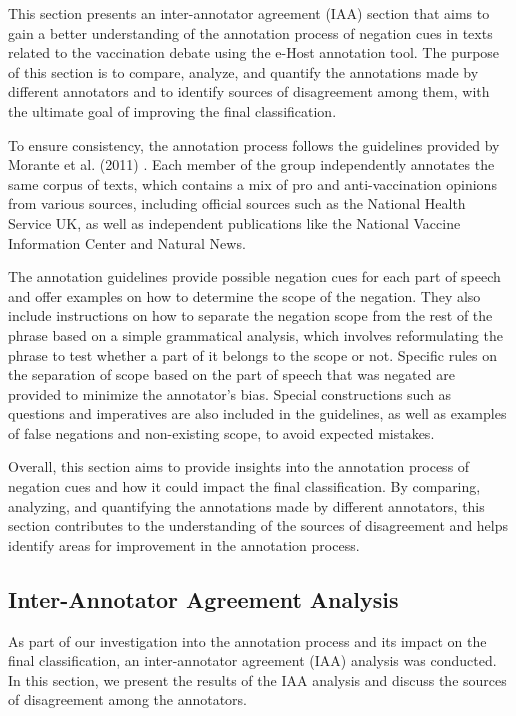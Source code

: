 This section presents an inter-annotator agreement (IAA) section that aims to gain a better understanding of the annotation process of negation cues in texts related to the vaccination debate using the e-Host annotation tool. The purpose of this section is to compare, analyze, and quantify the annotations made by different annotators and to identify sources of disagreement among them, with the ultimate goal of improving the final classification.

To ensure consistency, the annotation process follows the guidelines provided by Morante et al. (2011) \cite{morante2011annotation}. Each member of the group independently annotates the same corpus of texts, which contains a mix of pro and anti-vaccination opinions from various sources, including official sources such as the National Health Service UK, as well as independent publications like the National Vaccine Information Center and Natural News.

The annotation guidelines provide possible negation cues for each part of speech and offer examples on how to determine the scope of the negation. They also include instructions on how to separate the negation scope from the rest of the phrase based on a simple grammatical analysis, which involves reformulating the phrase to test whether a part of it belongs to the scope or not. Specific rules on the separation of scope based on the part of speech that was negated are provided to minimize the annotator's bias. Special constructions such as questions and imperatives are also included in the guidelines, as well as examples of false negations and non-existing scope, to avoid expected mistakes.

Overall, this section aims to provide insights into the annotation process of negation cues and how it could impact the final classification. By comparing, analyzing, and quantifying the annotations made by different annotators, this section contributes to the understanding of the sources of disagreement and helps identify areas for improvement in the annotation process.


\subsection{Inter-Annotator Agreement Analysis}
As part of our investigation into the annotation process and its impact on the final classification, an inter-annotator agreement (IAA) analysis was conducted. In this section, we present the results of the IAA analysis and discuss the sources of disagreement among the annotators.

